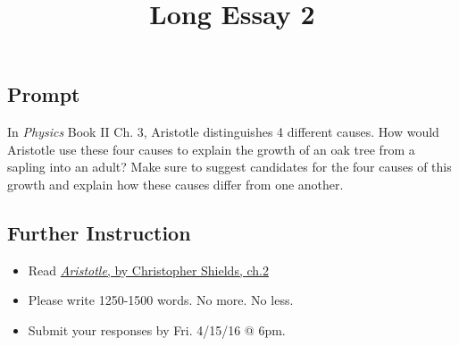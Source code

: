 \documentclass[]{article}
\title{Long Essay 2}
\date{}
\begin{document}
\maketitle

\subsection{Prompt}\label{prompt}

In \emph{Physics} Book II Ch. 3, Aristotle distinguishes 4 different
causes. How would Aristotle use these four causes to explain the growth
of an oak tree from a sapling into an adult? Make sure to suggest
candidates for the four causes of this growth and explain how these
causes differ from one another.

\subsection{Further Instruction}\label{further-instruction}

\begin{itemize}
\itemsep1pt\parskip0pt
\item
  Read \href{Shields.pdf}{\emph{Aristotle}, by Christopher Shields,
  ch.2}
\item
  Please write 1250-1500 words. No more. No less.
\item
  Submit your responses by Fri. 4/15/16 @ 6pm.
\end{itemize}
\end{document}
